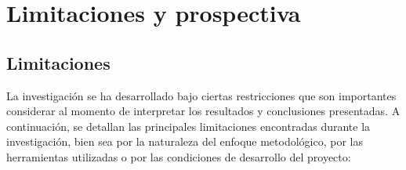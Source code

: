 \chapter{Limitaciones y prospectiva}





\section{Limitaciones}

La investigación se ha desarrollado bajo ciertas restricciones que son importantes considerar al momento de interpretar los resultados y conclusiones presentadas. A continuación, se detallan las principales limitaciones encontradas durante la investigación, bien sea por la naturaleza del enfoque metodológico, por las herramientas utilizadas o por las condiciones de desarrollo del proyecto:

